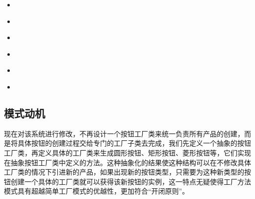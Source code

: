\documentclass[letterpaper,10pt,english]{sphinxmanual}
\begin{document}
\begin{sphinxShadowBox}
\begin{itemize}
\begin{itemize}
\item {} 
\sphinxAtStartPar
{}\label{\detokenize{creational_patterns/factory_method:id23}}{\hyperref[\detokenize{creational_patterns/factory_method:id9}]{}}

\item {} 
\sphinxAtStartPar
{}\label{\detokenize{creational_patterns/factory_method:id24}}{\hyperref[\detokenize{creational_patterns/factory_method:id10}]{}}

\item {} 
\sphinxAtStartPar
{}\label{\detokenize{creational_patterns/factory_method:id25}}{\hyperref[\detokenize{creational_patterns/factory_method:id11}]{}}

\item {} 
\sphinxAtStartPar
{}\label{\detokenize{creational_patterns/factory_method:id26}}{\hyperref[\detokenize{creational_patterns/factory_method:id12}]{}}

\item {} 
\sphinxAtStartPar
{}\label{\detokenize{creational_patterns/factory_method:id27}}{\hyperref[\detokenize{creational_patterns/factory_method:id13}]{}}

\item {} 
\sphinxAtStartPar
{}\label{\detokenize{creational_patterns/factory_method:id28}}{\hyperref[\detokenize{creational_patterns/factory_method:id14}]{}}

\end{itemize}

\end{itemize}
\end{sphinxShadowBox}


\subsection{模式动机}
\label{\detokenize{creational_patterns/factory_method:id2}}
\sphinxAtStartPar
现在对该系统进行修改，不再设计一个按钮工厂类来统一负责所有产品的创建，而是将具体按钮的创建过程交给专门的工厂子类去完成，我们先定义一个抽象的按钮工厂类，再定义具体的工厂类来生成圆形按钮、矩形按钮、菱形按钮等，它们实现在抽象按钮工厂类中定义的方法。这种抽象化的结果使这种结构可以在不修改具体工厂类的情况下引进新的产品，如果出现新的按钮类型，只需要为这种新类型的按钮创建一个具体的工厂类就可以获得该新按钮的实例，这一特点无疑使得工厂方法模式具有超越简单工厂模式的优越性，更加符合“开闭原则”。
\end{document}
